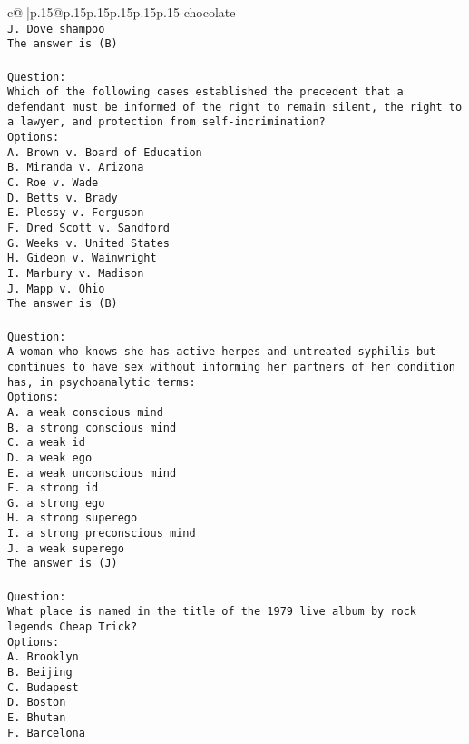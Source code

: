 \documentclass{article}
\begin{document}
{\begin{supertabular}{c@{$\;$}|p{.15\linewidth}@{}p{.15\linewidth}p{.15\linewidth}p{.15\linewidth}p{.15\linewidth}p{.15\linewidth}}
{{{chocolate\\ \tt J. Dove shampoo\\ \tt The answer is (B)\\ \tt \\ \tt Question:\\ \tt Which of the following cases established the precedent that a defendant must be informed of the right to remain silent, the right to a lawyer, and protection from self-incrimination?\\ \tt Options:\\ \tt A. Brown v. Board of Education\\ \tt B. Miranda v. Arizona\\ \tt C. Roe v. Wade\\ \tt D. Betts v. Brady\\ \tt E. Plessy v. Ferguson\\ \tt F. Dred Scott v. Sandford\\ \tt G. Weeks v. United States\\ \tt H. Gideon v. Wainwright\\ \tt I. Marbury v. Madison\\ \tt J. Mapp v. Ohio\\ \tt The answer is (B)\\ \tt \\ \tt Question:\\ \tt A woman who knows she has active herpes and untreated syphilis but continues to have sex without informing her partners of her condition has, in psychoanalytic terms:\\ \tt Options:\\ \tt A. a weak conscious mind\\ \tt B. a strong conscious mind\\ \tt C. a weak id\\ \tt D. a weak ego\\ \tt E. a weak unconscious mind\\ \tt F. a strong id\\ \tt G. a strong ego\\ \tt H. a strong superego\\ \tt I. a strong preconscious mind\\ \tt J. a weak superego\\ \tt The answer is (J)\\ \tt \\ \tt Question:\\ \tt What place is named in the title of the 1979 live album by rock legends Cheap Trick?\\ \tt Options:\\ \tt A. Brooklyn\\ \tt B. Beijing\\ \tt C. Budapest\\ \tt D. Boston\\ \tt E. Bhutan\\ \tt F. Barcelona\\ \tt }}}
\end{supertabular}}
\end{document}
